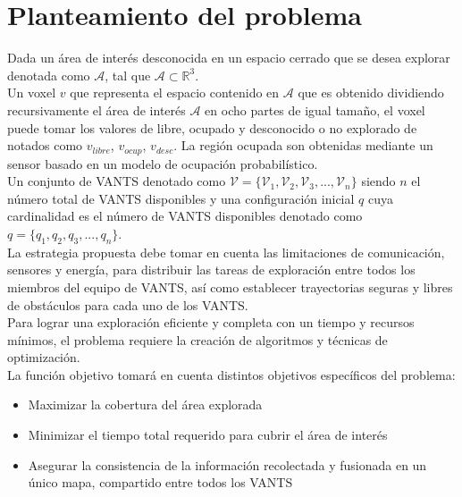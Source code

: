 \documentclass[sigconf]{acmart}
\begin{document}
\section{Planteamiento del problema}

Dada un área de interés desconocida en un espacio cerrado que se desea explorar denotada como $\mathcal{A}$, tal que $\mathcal{A} \subset \mathbb{R}^{3}$.\\

Un voxel $v$ que representa el espacio contenido en $\mathcal{A}$ que es obtenido dividiendo recursivamente el área de interés $\mathcal{A}$ en ocho partes de igual tamaño, el voxel puede tomar los valores de libre, ocupado y desconocido o no explorado de notados como $v_{libre}$, $v_{ocup}$, $v_{desc}$. La región ocupada son obtenidas mediante un sensor basado en un modelo de ocupación probabilístico.\\

Un conjunto de VANTS denotado como $\mathcal{V} = \{\mathcal{V}_{1},\mathcal{V}_{2},\mathcal{V}_{3},...,\mathcal{V}_{n}\}$ siendo $n$ el número total de VANTS disponibles y una configuración inicial $q$ cuya cardinalidad es el número de VANTS disponibles denotado como $q = \{q_{1},q_{2},q_{3},...,q_{n}\}$.\\


La estrategia propuesta debe tomar en cuenta las limitaciones de comunicación, sensores y energía, para distribuir las tareas de exploración entre todos los miembros del equipo de VANTS, así como establecer trayectorias seguras y libres de obstáculos para cada uno de los VANTS.\\

Para lograr una exploraci\'{o}n eficiente y completa con un tiempo y recursos m\'{i}nimos, el problema requiere la creaci\'{o}n de algoritmos y t\'{e}cnicas de optimizaci\'{o}n.\\

La funci\'{o}n objetivo tomar\'{a} en cuenta distintos objetivos espec\'{i}ficos del problema:
\begin{itemize}
\item Maximizar la cobertura del \'{a}rea explorada 
\item Minimizar el tiempo total requerido para cubrir el \'{a}rea de inter\'{e}s
\item Asegurar la consistencia de la información recolectada y fusionada en un único mapa, compartido entre todos los VANTS
\end{itemize}
\end{document}
